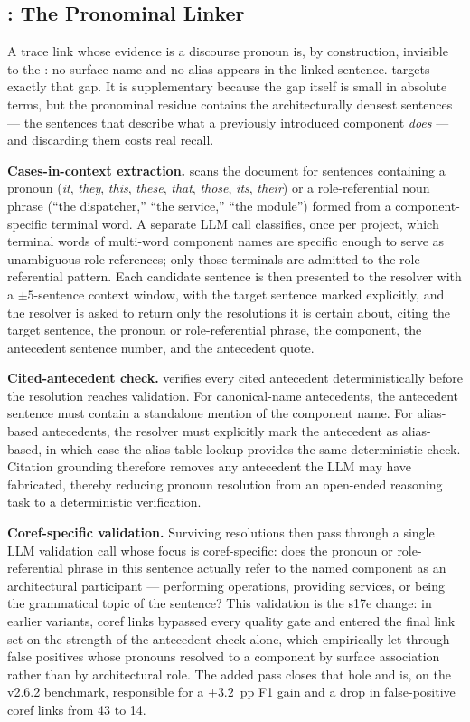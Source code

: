 \subsection{\coref: The Pronominal Linker}\label{sec:coref}

A trace link whose evidence is a discourse pronoun is, by
construction, invisible to the \multiframing: no surface name and
no alias appears in the linked sentence.
\coref targets exactly that gap.
It is supplementary because the gap itself is small in absolute
terms, but the pronominal residue contains the architecturally
densest sentences --- the sentences that describe what a previously
introduced component \emph{does} --- and discarding them costs
real recall.

\textbf{Cases-in-context extraction.}
\coref scans the document for sentences containing a pronoun
(\emph{it}, \emph{they}, \emph{this}, \emph{these}, \emph{that},
\emph{those}, \emph{its}, \emph{their}) or a role-referential
noun phrase (``the dispatcher,'' ``the service,'' ``the module'')
formed from a component-specific terminal word.
A separate LLM call classifies, once per project, which terminal
words of multi-word component names are specific enough to serve
as unambiguous role references; only those terminals are admitted
to the role-referential pattern.
Each candidate sentence is then presented to the resolver with a
$\pm 5$-sentence context window, with the target sentence marked
explicitly, and the resolver is asked to return only the
resolutions it is certain about, citing the target sentence, the
pronoun or role-referential phrase, the component, the antecedent
sentence number, and the antecedent quote.

\textbf{Cited-antecedent check.}
\approach verifies every cited antecedent deterministically before
the resolution reaches validation.
For canonical-name antecedents, the antecedent sentence must
contain a standalone mention of the component name.
For alias-based antecedents, the resolver must explicitly mark the
antecedent as alias-based, in which case the alias-table lookup
provides the same deterministic check.
Citation grounding therefore removes any antecedent the LLM may
have fabricated, thereby reducing pronoun resolution from an
open-ended reasoning task to a deterministic verification.

\textbf{Coref-specific validation.}
Surviving resolutions then pass through a single LLM validation
call whose focus is coref-specific: does the pronoun or
role-referential phrase in this sentence actually refer to the
named component as an architectural participant --- performing
operations, providing services, or being the grammatical topic of
the sentence?
This validation is the s17e change: in earlier variants, coref
links bypassed every quality gate and entered the final link set
on the strength of the antecedent check alone, which empirically
let through false positives whose pronouns resolved to a component
by surface association rather than by architectural role.
The added pass closes that hole and is, on the v2.6.2 benchmark,
responsible for a $+3.2$~pp F1 gain and a drop in false-positive
coref links from 43 to 14.

